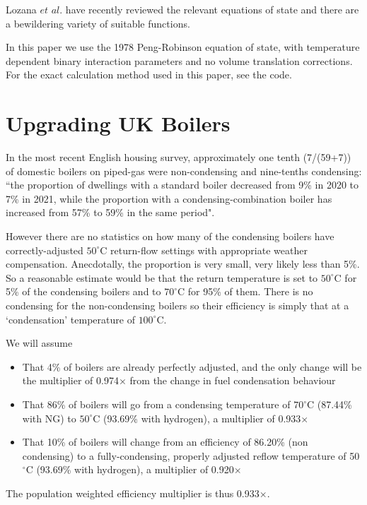 \documentclass[5p]{elsarticle} %
\begin{document}
Lozana $et$ $al.$ have recently reviewed\citep{Lozana2022}  the relevant equations of state and there are a bewildering variety of suitable functions.

 In this paper we use the 1978 Peng-Robinson equation of state\citep{Tabkhi2008, Abbas2021}, with temperature dependent binary interaction parameters and no volume translation corrections.
 For the exact calculation method used in this paper, see the code\citep{Sargents_github}. 

\section{Upgrading UK Boilers}
\label{appendix:more-boilers}

In the most recent English housing survey\citep{ehs21}, approximately one tenth (7/(59+7)) of domestic boilers on piped-gas were non-condensing and nine-tenths condensing: 
``the proportion of dwellings with a standard boiler decreased from 9\% in 2020 to 7\% in 2021, while the proportion with a condensing-combination boiler has increased from 57\% to 59\% in the same period".

However there are no statistics on how many of the condensing boilers have correctly-adjusted $50^\circ$C return-flow settings with appropriate weather compensation. Anecdotally, the proportion is very small, very likely less than 5\%. So a reasonable estimate would be that the return temperature is set to $50^\circ$C for 5\% of the condensing boilers and to $70^\circ$C for 95\% of them. There is no condensing for the non-condensing boilers so their efficiency is simply that at  a `condensation' temperature of $100^\circ$C.

We will assume
\begin{itemize}
    \item That 4\% of boilers are already perfectly adjusted, and the only change will be the multiplier of 0.974$\times$ from the change in fuel condensation behaviour
    \item That 86\% of boilers will go from a condensing temperature of $70^\circ$C (87.44\% with NG) to $50^\circ$C (93.69\% with hydrogen), a multiplier of  0.933$\times$
    \item That 10\% of boilers will change from an efficiency of  86.20\% (non condensing) to a fully-condensing, properly adjusted reflow temperature of 50$^\circ$C (93.69\% with hydrogen), a multiplier of 0.920$\times$
\end{itemize}
The population weighted efficiency multiplier is thus 0.933$\times$.
\end{document}
